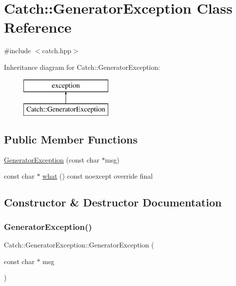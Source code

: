 \hypertarget{class_catch_1_1_generator_exception}{}\section{Catch\+:\+:Generator\+Exception Class Reference}
\label{class_catch_1_1_generator_exception}


{\ttfamily \#include $<$catch.\+hpp$>$}

Inheritance diagram for Catch\+:\+:Generator\+Exception\+:\begin{figure}[H]
\begin{center}
\leavevmode
\includegraphics[height=2.000000cm]{class_catch_1_1_generator_exception}
\end{center}
\end{figure}
\subsection*{Public Member Functions}
\begin{DoxyCompactItemize}
\item 
\mbox{\hyperlink{class_catch_1_1_generator_exception_a3cf9282d555ec32389665ce723bf36ea}{Generator\+Exception}} (const char $\ast$msg)
\item 
const char $\ast$ \mbox{\hyperlink{class_catch_1_1_generator_exception_ade029163144d136f12187e5b9a0161d5}{what}} () const noexcept override final
\end{DoxyCompactItemize}


\subsection{Constructor \& Destructor Documentation}
\mbox{\label{class_catch_1_1_generator_exception_a3cf9282d555ec32389665ce723bf36ea}} 
\subsubsection{\texorpdfstring{Generator\+Exception()}{GeneratorException()}}
{\footnotesize\ttfamily Catch\+::\+Generator\+Exception\+::\+Generator\+Exception (\begin{DoxyParamCaption}\item[{const char $\ast$}]{msg }\end{DoxyParamCaption})\hspace{0.3cm}{\ttfamily [inline]}}



